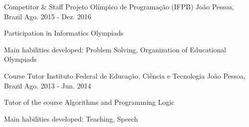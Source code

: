 \begin{cventries}
      \cventry
        {Competitor \& Staff} %
        {Projeto Olímpico de Programação (IFPB)} %
        {João Pessoa, Brazil} %
        {Ago. 2015 - Dez. 2016} %
        {
          \begin{cvitems} %
            \item {Participation in Informatics Olympiads}
            \item {Main habilities developed: Problem Solving, Organization of Educational Olympiads}
          \end{cvitems}
        }
%

  \cventry
    {Course Tutor} %
    {Instituto Federal de Educação, Ciência e Tecnologia} %
    {João Pessoa, Brazil} %
    {Ago. 2013 - Jun. 2014} %
    {
      \begin{cvitems} %
          \item {Tutor of the course Algorithms and Programming Logic}
          \item {Main habilities developed: Teaching, Speech}
      \end{cvitems}
    }
\end{cventries}

